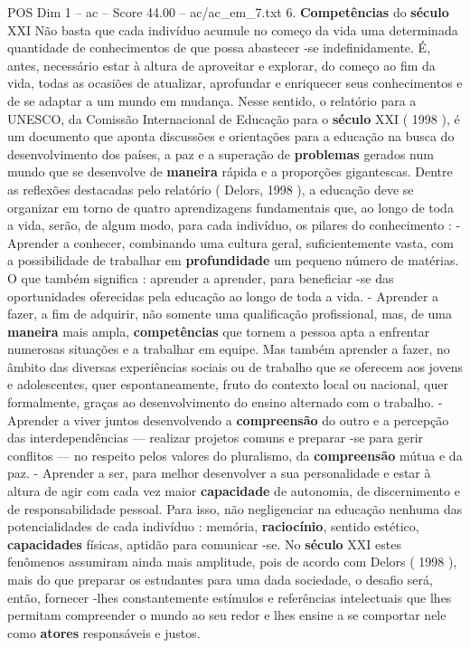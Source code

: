 \begin{textsample}{POS Dim 1 – ac – Score 44.00 – ac/ac\_em\_7.txt}  \label{ex:f1_pos_178}
6. \textbf{Competências} do \textbf{século} XXI Não basta que cada indivíduo acumule no começo da vida uma determinada quantidade de conhecimentos de que possa abastecer -se indefinidamente.
É, antes, necessário estar à altura de aproveitar e explorar, do começo ao fim da vida, todas as ocasiões de atualizar, aprofundar e enriquecer seus conhecimentos e de se adaptar a um mundo em mudança.
Nesse sentido, o relatório para a UNESCO, da Comissão Internacional de Educação para o \textbf{século} XXI ( 1998 ), é um documento que aponta discussões e orientações para a educação na busca do desenvolvimento dos países, a paz e a superação de \textbf{problemas} gerados num mundo que se desenvolve de \textbf{maneira} rápida e a proporções gigantescas.
Dentre as reflexões destacadas pelo relatório ( Delors, 1998 ), a educação deve se organizar em torno de quatro aprendizagens fundamentais que, ao longo de toda a vida, serão, de algum modo, para cada indivíduo, os pilares do conhecimento : - Aprender a conhecer, combinando uma cultura geral, suficientemente vasta, com a possibilidade de trabalhar em \textbf{profundidade} um pequeno número de matérias.
O que também significa : aprender a aprender, para beneficiar -se das oportunidades oferecidas pela educação ao longo de toda a vida. - Aprender a fazer, a fim de adquirir, não somente uma qualificação profissional, mas, de uma \textbf{maneira} mais ampla, \textbf{competências} que tornem a pessoa apta a enfrentar numerosas situações e a trabalhar em equipe.
Mas também aprender a fazer, no âmbito das diversas experiências sociais ou de trabalho que se oferecem aos jovens e adolescentes, quer espontaneamente, fruto do contexto local ou nacional, quer formalmente, graças ao desenvolvimento do ensino alternado com o trabalho. - Aprender a viver juntos desenvolvendo a \textbf{compreensão} do outro e a percepção das interdependências — realizar projetos comuns e preparar -se para gerir conflitos — no respeito pelos valores do pluralismo, da \textbf{compreensão} mútua e da paz. - Aprender a ser, para melhor desenvolver a sua personalidade e estar à altura de agir com cada vez maior \textbf{capacidade} de autonomia, de discernimento e de responsabilidade pessoal.
Para isso, não negligenciar na educação nenhuma das potencialidades de cada indivíduo : memória, \textbf{raciocínio}, sentido estético, \textbf{capacidades} físicas, aptidão para comunicar -se.
No \textbf{século} XXI estes fenômenos assumiram ainda mais amplitude, pois de acordo com Delors ( 1998 ), mais do que preparar os estudantes para uma dada sociedade, o desafio será, então, fornecer -lhes constantemente estímulos e referências intelectuais que lhes permitam compreender o mundo ao seu redor e lhes ensine a se comportar nele como \textbf{atores} responsáveis e justos.

\end{textsample}
